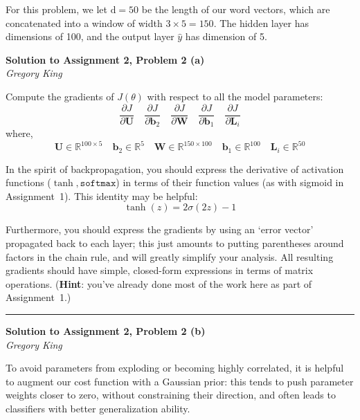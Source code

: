 \documentclass[letter,12pt]{article}
\newcommand{\myhwtitle}[3]
{\begin{center}
{\large {\bf Solution to Assignment {#1}, Problem {#2}}}\\
\medskip
{\it {#3}} %
\end{center}}
\newcommand{\solutionsAuthor}{Gregory King}
\begin{document}
\noindent For this problem, we let $\textrm{d} = 50$ be the length of our word vectors, which are concatenated into a window of width $3\times5=150$. The hidden layer has dimensions of 100, and the output layer $\hat{y}$ has dimension of 5.

\myhwtitle{2}{2 (a)}{\solutionsAuthor}

\noindent Compute the gradients of $J(\theta)$ with respect to all the model parameters:\\
\begin{equation}
\frac{\partial J}{\partial{\boldsymbol U}}\quad\frac{\partial J}{\partial{\boldsymbol b}_{2}}\quad\frac{\partial J}{\partial{\boldsymbol W}}\quad\frac{\partial J}{\partial{\boldsymbol b}_{1}}\quad\frac{\partial J}{\partial{\boldsymbol L}_{i}}
\end{equation}
where,\\
\begin{equation}
{\boldsymbol U}\in\mathbb{R}^{100\times5}\quad{\boldsymbol b}_{2}\in\mathbb{R}^{5}\quad{\boldsymbol W}\in\mathbb{R}^{150\times100}\quad{\boldsymbol b}_{1}\in\mathbb{R}^{100}\quad{\boldsymbol L}_{i}\in\mathbb{R}^{50}
\end{equation}

\noindent In the spirit of backpropagation, you should express the derivative of activation functions ($\tanh,\texttt{softmax}$) in terms of their function values (as with sigmoid in Assignment~1). This identity may be helpful:\\
\begin{equation}
\tanh(z) = 2\sigma(2z)-1
\end{equation}

\noindent Furthermore, you should express the gradients by using an `error vector' propagated back to each layer; this just amounts to putting parentheses around factors in the chain rule, and will greatly simplify your analysis. All resulting gradients should have simple, closed-form expressions in terms of matrix operations. (\textbf{Hint}: you've already done most of the work here as part of Assignment~1.)

\vspace{5mm}
\noindent\rule{\textwidth}{0.4pt}

\clearpage

\myhwtitle{2}{2 (b)}{\solutionsAuthor}

\bigskip

\noindent To avoid parameters from exploding or becoming highly correlated, it is helpful to augment our cost function with a Gaussian prior: this tends to push parameter weights closer to zero, without constraining their direction, and often leads to classifiers with better generalization ability.\\
\end{document}
